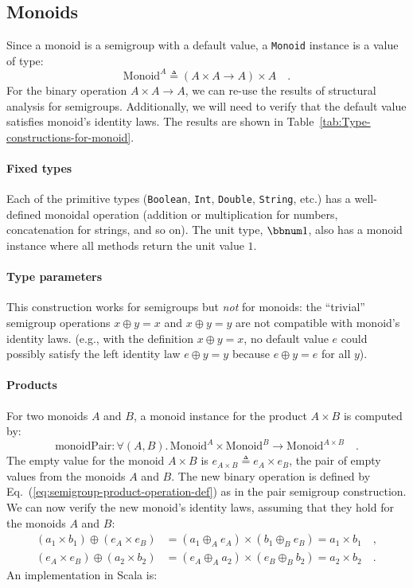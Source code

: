 \subsection{Monoids\label{subsec:Monoids-constructions}}

Since a monoid is a semigroup with a default value, a \lstinline!Monoid!
instance is a value of type:
\[
\text{Monoid}^{A}\triangleq\left(A\times A\rightarrow A\right)\times A\quad.
\]
For the binary operation $A\times A\rightarrow A$, we can re-use
the results of structural analysis for semigroups. Additionally, we
will need to verify that the default value satisfies monoid\textsf{'}s identity
laws. The results are shown in Table~\ref{tab:Type-constructions-for-monoid}.

\paragraph{Fixed types}

Each of the primitive types (\lstinline!Boolean!, \lstinline!Int!,
\lstinline!Double!, \lstinline!String!, etc.) has a well-defined
monoidal operation (addition or multiplication for numbers, concatenation
for strings, and so on). The unit type, $\bbnum 1$, also has a monoid
instance where all methods return the unit value $1$.

\paragraph{Type parameters}

This construction works for semigroups but \emph{not} for monoids:
the \textsf{``}trivial\textsf{''} semigroup operations $x\oplus y=x$ and $x\oplus y=y$
are not compatible with monoid\textsf{'}s identity laws. (e.g., with the definition
$x\oplus y=x$, no default value $e$ could possibly satisfy the left
identity law $e\oplus y=y$ because $e\oplus y=e$ for all $y$).

\paragraph{Products}

For two monoids $A$ and $B$, a monoid instance for the product $A\times B$
is computed by:
\[
\text{monoidPair}:\forall(A,B).\,\text{Monoid}^{A}\times\text{Monoid}^{B}\rightarrow\text{Monoid}^{A\times B}\quad.
\]
The empty value for the monoid $A\times B$ is $e_{A\times B}\triangleq e_{A}\times e_{B}$,
the pair of empty values from the monoids $A$ and $B$. The new binary
operation is defined by Eq.~(\ref{eq:semigroup-product-operation-def})
as in the pair semigroup construction. We can now verify the new monoid\textsf{'}s
identity laws, assuming that they hold for the monoids $A$ and $B$:
\begin{align*}
(a_{1}\times b_{1})\oplus(e_{A}\times e_{B}) & =(a_{1}\oplus_{A}e_{A})\times(b_{1}\oplus_{B}e_{B})=a_{1}\times b_{1}\quad,\\
(e_{A}\times e_{B})\oplus(a_{2}\times b_{2}) & =(e_{A}\oplus_{A}a_{2})\times(e_{B}\oplus_{B}b_{2})=a_{2}\times b_{2}\quad.
\end{align*}
An implementation in Scala is:

